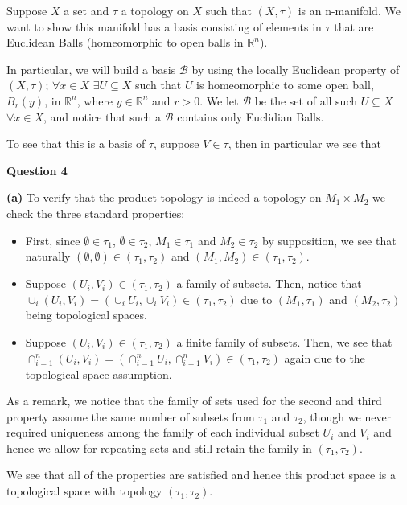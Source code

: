 \documentclass[10pt]{article}
\newcommand{\R}{\mathbb{R}}
\begin{document}
Suppose $X$ a set and $\tau$ a topology on $X$ such that $(X,\tau)$ is an n-manifold. We want to show this manifold has a basis consisting of elements in $\tau$ that are Euclidean Balls (homeomorphic to open balls in $\R^{n}$).

In particular, we will build a basis $\mathcal{B}$ by using the locally Euclidean property of $(X,\tau)$; $\forall x\in X$ $ \exists U\subseteq X$ such that $U$ is homeomorphic to some open ball, $B_{r}(y)$, in $\R^{n}$, where $y\in \R^{n}$ and $r>0$. We let $\mathcal{B}$ be the set of all such $U \subseteq X$ $\forall x \in X$, and notice that such a $\mathcal{B}$ contains only Euclidian Balls.

To see that this is a basis of $\tau$, suppose $V \in \tau$, then in particular we see that 

\newpage

\textbf{Question 4}

\textbf{(a)} To verify that the product topology is indeed a topology on $M_{1} \times M_{2}$ we check the three standard properties:

\begin{itemize}
\item First, since $\emptyset \in \tau_{1}$, $\emptyset \in \tau_{2}$, $M_{1}\in \tau_{1}$ and $M_{2}\in \tau_{2}$ by supposition, we see that naturally $(\emptyset,\emptyset)\in (\tau_{1},\tau_{2})$ and $(M_{1},M_{2}) \in (\tau_{1},\tau_{2})$.
\item Suppose $(U_{i},V_{i})\in (\tau_{1},\tau_{2})$ a family of subsets. Then, notice that $\cup_{i}(U_{i},V_{i}) = (\cup_{i}U_{i},\cup_{i}V_{i})\in (\tau_{1},\tau_{2})$ due to $(M_{1},\tau_{1})$ and $(M_{2},\tau_{2})$ being topological spaces.
\item Suppose $(U_{i},V_{i})\in (\tau_{1},\tau_{2})$ a finite family of subsets. Then, we see that $\cap_{i=1}^{n}(U_{i},V_{i}) = (\cap_{i=1}^{n}U_{i},\cap_{i=1}^{n}V_{i})\in (\tau_{1},\tau_{2})$ again due to the topological space assumption.
\end{itemize}

As a remark, we notice that the family of sets used for the second and third property assume the same number of subsets from $\tau_{1}$ and $\tau_{2}$, though we never required uniqueness among the family of each individual subset $U_{i}$ and $V_{i}$ and hence we allow for repeating sets and still retain the family in $(\tau_{1},\tau_{2})$.

We see that all of the properties are satisfied and hence this product space is a topological space with topology $(\tau_{1},\tau_{2})$. 
\end{document}
